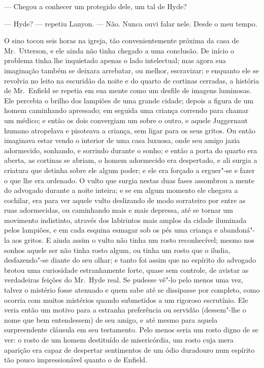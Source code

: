 --- Chegou a conhecer um protegido dele, um tal de Hyde?

--- Hyde? --- repetiu Lanyon. --- Não.  Nunca ouvi falar nele.  Desde o meu
tempo.


O sino tocou seis horas na igreja, tão convenientemente próxima da casa
de Mr.~Utterson, e ele ainda não tinha chegado a uma conclusão.  De
início o problema tinha lhe inquietado apenas o lado intelectual; mas
agora sua imaginação também se deixara arrebatar, ou melhor,
escravizar; e enquanto ele se revolvia no leito na escuridão da noite e
do quarto de cortinas cerradas, a história de Mr.~Enfield se repetia em
sua mente como um desfile de imagens luminosas.  Ele percebia o brilho
dos lampiões de uma grande cidade; depois a figura de um homem
caminhando apressado; em seguida uma criança correndo para chamar um
médico; e então os dois convergiam um sobre o outro, e aquele
Juggernaut humano atropelava e pisoteava a criança, sem ligar para os
seus gritos.  Ou então imaginava estar vendo o interior de uma casa
luxuosa, onde seu amigo jazia adormecido, sonhando, e sorrindo durante
o sonho; e então a porta do quarto era aberta, as cortinas se abriam, o
homem adormecido era despertado, e ali surgia a criatura que detinha
sobre ele algum poder; e ele era forçado a erguer"-se e fazer o que lhe
era ordenado.  O vulto que surgia nestas duas fases assombrou a mente
do advogado durante a noite inteira; e se em algum momento ele chegava
a cochilar, era para ver aquele vulto deslizando de modo sorrateiro por
entre as ruas adormecidas, ou caminhando mais e mais depressa, até se
tornar um movimento indistinto, através dos labirintos mais amplos da
cidade iluminada pelos lampiões, e em cada esquina esmagar sob os pés
uma criança e abandoná"-la aos gritos.  E ainda assim o vulto não tinha
um rosto reconhecível; mesmo nos sonhos aquele ser não tinha rosto
algum, ou tinha um rosto que o iludia, desfazendo"-se diante do seu
olhar; e tanto foi assim que no espírito do advogado brotou uma
curiosidade estranhamente forte, quase sem controle, de avistar as
verdadeiras feições do Mr.~Hyde real.  Se pudesse vê"-lo pelo menos uma
vez, talvez o mistério fosse atenuado e quem sabe até se dissipasse por
completo, como ocorria com muitos mistérios quando submetidos a um
rigoroso escrutínio.  Ele veria então um motivo para a estranha
preferência ou servidão (dessem"-lhe o nome que bem entendessem) de seu
amigo, e até mesmo para aquela surpreendente cláusula em seu
testamento.  Pelo menos seria um rosto digno de se ver: o rosto de um
homem destituído de misericórdia, um rosto cuja mera aparição era capaz
de despertar sentimentos de um ódio duradouro num espírito tão pouco
impressionável quanto o de Enfield.

